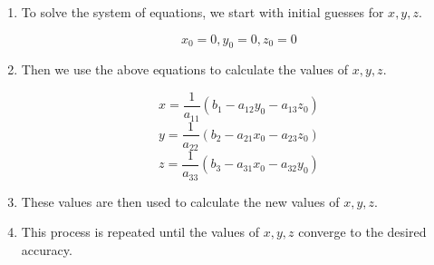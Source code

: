 \begin{enumerate}
  \item To solve the system of equations, we start with initial guesses for $x, y, z$.

  \begin {equation*}
    x_0 = 0, y_0 = 0, z_0 = 0
  \end{equation*}

  \item  Then we use the above equations to calculate the values of $x, y, z$.

  \begin{equation*}
    x = \frac{1}{a_{11}}(b_1 - a_{12}y_0 - a_{13}z_0)
  \end{equation*}
  \begin{equation*}
    y = \frac{1}{a_{22}}(b_2 - a_{21}x_0 - a_{23}z_0)
  \end{equation*}
  \begin{equation*}
    z = \frac{1}{a_{33}}(b_3 - a_{31}x_0 - a_{32}y_0)
  \end{equation*}


  \item  These values are then used to calculate the new values of $x, y, z$.
  \item  This process is repeated until the values of $x, y, z$ converge to the desired accuracy.
\end{enumerate}
